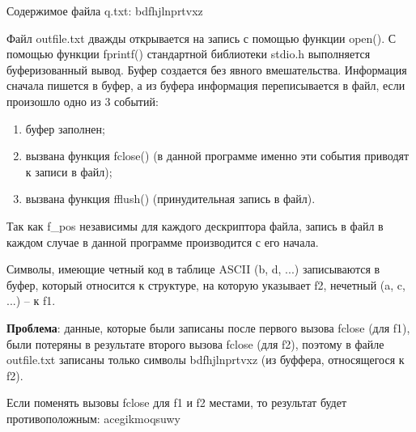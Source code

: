 \documentclass[12pt]{report}
\begin{document}
Содержимое файла q.txt: bdfhjlnprtvxz

Файл outfile.txt дважды открывается на запись с помощью функции open(). 
С помощью функции fprintf() стандартной библиотеки stdio.h выполняется буферизованный вывод. Буфер создается без явного вмешательства. Информация сначала пишется в буфер, а из буфера информация переписывается в файл, если произошло одно из 3 событий:

\begin{enumerate}
	\item буфер заполнен;
	\item вызвана функция fclose() (в данной программе именно эти события приводят к записи в файл);
	\item вызвана функция fflush() (принудительная запись в файл).
\end{enumerate}

Так как f\_pos независимы для каждого дескриптора файла, запись в файл в каждом случае  в данной программе производится с его начала.

Символы, имеющие четный код в таблице ASCII  (b, d, ...) записываются в буфер, который относится к структуре, на которую указывает f2, нечетный (a, c, ...) -- к f1. 

\textbf{Проблема}: данные, которые были записаны после первого вызова fclose (для f1), были потеряны в результате второго вызова fclose (для f2), поэтому в файле outfile.txt записаны только символы bdfhjlnprtvxz (из буффера, относящегося к f2).

Если поменять вызовы fclose для f1 и f2 местами, то результат будет противоположным: acegikmoqsuwy
\end{document}
